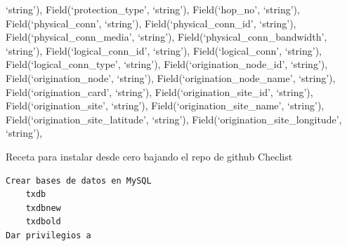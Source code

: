 \documentclass[
  12pt,
  spanish,
]{article}
\begin{document}
`string'), Field(`protection\_type', `string'), Field(`hop\_no',
`string'), Field(`physical\_conn', `string'),
Field(`physical\_conn\_id', `string'), Field(`physical\_conn\_media',
`string'), Field(`physical\_conn\_bandwidth', `string'),
Field(`logical\_conn\_id', `string'), Field(`logical\_conn', `string'),
Field(`logical\_conn\_type', `string'), Field(`origination\_node\_id',
`string'), Field(`origination\_node', `string'),
Field(`origination\_node\_name', `string'), Field(`origination\_card',
`string'), Field(`origination\_site\_id', `string'),
Field(`origination\_site', `string'), Field(`origination\_site\_name',
`string'), Field(`origination\_site\_latitude', `string'),
Field(`origination\_site\_longitude', `string'),

Receta para instalar desde cero bajando el repo de github Checlist

\begin{verbatim}
Crear bases de datos en MySQL
    txdb
    txdbnew
    txdbold
Dar privilegios a
\end{verbatim}
\end{document}
